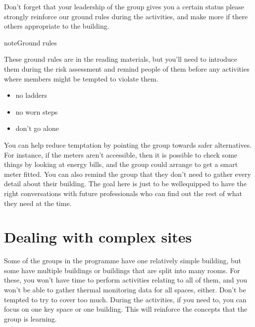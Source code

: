 \documentclass[letterpaper,10pt,english]{jupyterBook}
\begin{document}
\sphinxAtStartPar
Don’t forget that your leadership of the group gives you a certain status \sphinxhyphen{} please strongly reinforce our ground rules during the activities, and make more if there others appropriate to the building.

\begin{sphinxadmonition}{note}{Ground rules}

\sphinxAtStartPar
These ground rules are in the reading materials, but you’ll need to introduce them during the risk assessment and remind people of them before any activities where members might be tempted to violate them.
\begin{itemize}
\item {} 
\sphinxAtStartPar
no ladders

\item {} 
\sphinxAtStartPar
no worn steps

\item {} 
\sphinxAtStartPar
don’t go alone

\end{itemize}
\end{sphinxadmonition}

\sphinxAtStartPar
You can help reduce temptation by pointing the group towards safer alternatives.  For instance, if the meters aren’t accessible, then it is possible to check some things by looking at energy bills, and the group could arrange to get a smart meter fitted. You can also remind the group that they don’t need to gather every detail about their building.  The goal here is just to be well\sphinxhyphen{}equipped to have the right conversations with future professionals \sphinxhyphen{} who can find out the rest of what they need at the time.

\sphinxstepscope


\chapter{Dealing with complex sites}
\label{\detokenize{complex-sites:dealing-with-complex-sites}}\label{\detokenize{complex-sites::doc}}
\sphinxAtStartPar
Some of the groups in the programme have one relatively simple building, but some have multiple buildings or buildings that are split into many rooms.  For these, you won’t have time to perform activities relating to all of them, and you won’t be able to gather thermal monitoring data for all spaces, either.  Don’t be tempted to try to cover too much.  During the activities, if you need to, you can focus on one key space or one building.  This will reinforce the concepts that the group is learning.
\end{document}
